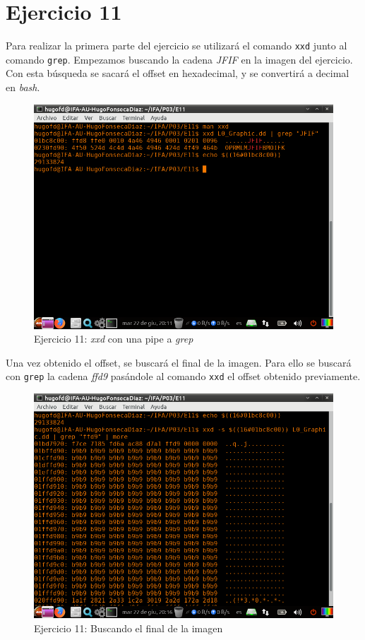 \documentclass[11pt]{article}
\begin{document}
\section{Ejercicio 11}
Para realizar la primera parte del ejercicio se utilizará el comando \verb|xxd| junto al comando \verb|grep|. Empezamos buscando la cadena \textit{JFIF} en la imagen del ejercicio. Con esta búsqueda se sacará el offset en hexadecimal, y se convertirá a decimal en \textit{bash}.

\begin{figure}[H]
    \caption{Ejercicio 11: \textit{xxd} con una pipe a \textit{grep}}
    \centering
    \includegraphics[scale=0.7]{e11-1.png}
\end{figure}

Una vez obtenido el offset, se buscará el final de la imagen. Para ello se buscará con \verb|grep| la cadena \textit{ffd9} pasándole al comando \verb|xxd| el offset obtenido previamente.

\begin{figure}[H]
    \caption{Ejercicio 11: Buscando el final de la imagen}
    \centering
    \includegraphics[scale=0.7]{e11-2.png}
\end{figure}
\end{document}
